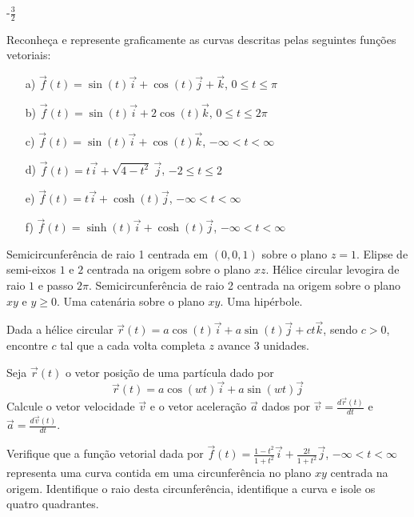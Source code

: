 \begin{resp}
 -$\frac{3}{2}$
\end{resp}
\begin{exer} Reconheça e represente graficamente as curvas descritas pelas seguintes funções vetoriais:
\begin{itemize}
\item [a)] $\vec{f}(t)=\sin(t)\vec{i}+\cos(t)\vec{j}+\vec{k}$, $0\leq t \leq \pi$
\item [b)] $\vec{f}(t)=\sin(t)\vec{i}+2\cos(t)\vec{k}$, $0\leq t \leq 2\pi$
\item [c)] $\vec{f}(t)=\sin(t)\vec{i}+\cos(t)\vec{k}$, $-\infty < t < \infty$
\item [d)] $\vec{f}(t)=t\vec{i}+\sqrt{4-t^2}~\!\vec{j}$, $-2 \leq t \leq 2$
\item [e)] $\vec{f}(t)=t\vec{i}+\cosh(t)\vec{j}$, $-\infty < t < \infty $
\item [f)] $\vec{f}(t)=\sinh(t)\vec{i}+\cosh(t)\vec{j}$, $-\infty < t< \infty $
\end{itemize} 
\end{exer}
\begin{resp} Semicircunferência de raio 1 centrada em $(0,0,1)$ sobre o plano $z=1$. Elipse de semi-eixos $1$ e $2$ centrada na origem sobre o plano $xz$. Hélice circular levogira de raio $1$ e passo $2\pi$.  Semicircunferência de raio 2 centrada na origem sobre o plano $xy$ e $y\geq 0$. Uma catenária sobre o plano $xy$. Uma hipérbole. 
\end{resp}
\begin{exer}Dada a hélice circular $\vec{r}(t)=a\cos(t)\vec{i}+a\sin(t)\vec{j}+ct\vec{k}$, sendo $c>0$, encontre $c$ tal que a cada volta completa $z$ avance $3$ unidades.
 \end{exer}
\begin{exer}Seja $\vec{r}(t)$ o vetor posição de uma partícula dado por
$$\vec{r}(t)=a\cos(wt)\vec{i}+a\sin(wt)\vec{j}$$
Calcule o vetor velocidade $\vec{v}$ e o vetor aceleração $\vec{a}$ dados por $\vec{v}=\frac{d\vec{r}(t)}{dt}$ e $\vec{a}=\frac{d\vec{v}(t)}{dt}$.
\end{exer}



\begin{exer} Verifique que a função vetorial dada por $\vec{f}(t)=\frac{1-t^2}{1+t^2}\vec{i}+\frac{2t}{1+t^2}\vec{j}$, $-\infty<t<\infty$
representa uma curva contida em uma circunferência no plano $xy$  centrada na origem. Identifique o raio desta circunferência, identifique a curva e isole os quatro quadrantes.
\end{exer}

